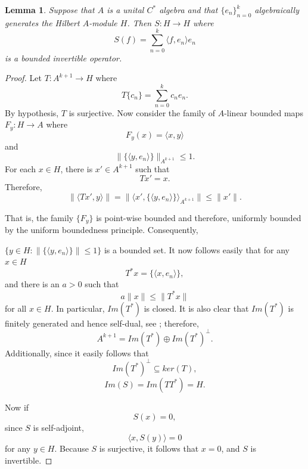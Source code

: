 \documentclass[11pt]{amsart}
\newtheorem{lem}[thm]{Lemma}
\theoremstyle{definition}
\numberwithin{equation}{section}
\begin{document}
\begin{lem}\label{frameoplemma}
Suppose that $A$ is a unital $C^{*}$ algebra and that $\{e_{n}\}_{n=0}^{k}$ algebraically generates the Hilbert $A$-module $H$. Then $S:H\to H$ where $$S(f)=\sum_{n=0}^{k}\langle f, e_{n}\rangle e_{n}$$ is a bounded invertible operator.
\end{lem}
\begin{proof}
Let $T: A^{k+1}\to H$ where
$$T\{c_{n}\}=\sum_{n=0}^{k}c_{n}e_{n}.$$ By hypothesis, $T$ is surjective. Now consider the family of $A$-linear bounded maps $F_{y}: H\to A$
where $$F_{y}(x)=\langle x, y\rangle $$ and $$\|\{\langle y, e_{n}\rangle \}\|_{A^{k+1}}\leq 1.$$
For each $x\in H$, there is $x'\in A^{k+1}$ such that $$Tx'=x.$$ Therefore,
$$\|\langle Tx', y\rangle \| =\|\langle x', \{\langle y,e_{n}\rangle \} \rangle_{A^{k+1}} \| \leq \|x'\|.$$

That is, the family $\{F_{y}\}$ is point-wise bounded and therefore, uniformly bounded by the uniform boundedness principle. Consequently,

$\{y\in H: \|\{\langle y, e_{n}\rangle \}\|\leq 1\}$ is a bounded set. It now follows easily that for any $x\in H$
$$T^{*}x=\{\langle x,e_{n}\rangle\},$$
and there is an $a>0$ such that 
$$a\|x\|\leq \|T^{*}x\|$$
for all $x\in H$. In particular, $Im(T^{*})$ is closed. It is also clear that $Im(T^{*})$ is finitely generated and hence self-dual, see \cite{Frank2002Frames}; therefore,
$$A^{k+1}=Im(T^{*})\oplus Im(T^{*})^{\perp}.$$ Additionally, since it easily follows that 
$$Im(T^{*})^{\perp}\subseteq ker(T),$$
$$Im(S)=Im(TT^{*})=H.$$

Now if $$S(x)=0,$$ since $S$ is self-adjoint,
$$\langle x, S(y)\rangle =0$$ for any $y\in H$.
Because $S$ is surjective, it follows that $x=0$, and $S$ is invertible.



\end{proof}
\end{document}
